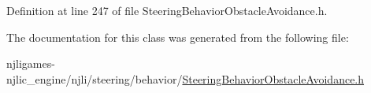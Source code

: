 Definition at line 247 of file Steering\+Behavior\+Obstacle\+Avoidance.\+h.



The documentation for this class was generated from the following file\+:\begin{DoxyCompactItemize}
\item 
njligames-\/njlic\+\_\+engine/njli/steering/behavior/\mbox{\hyperlink{_steering_behavior_obstacle_avoidance_8h}{Steering\+Behavior\+Obstacle\+Avoidance.\+h}}\end{DoxyCompactItemize}
